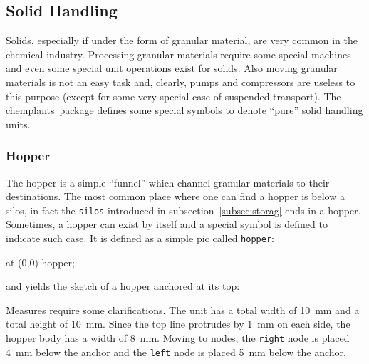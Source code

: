 \documentclass[12pt]{article}						%
\newcommand*{\chpn}[1]{\texttt{#1}}				%
\newcommand*{\chpp}[1]{\texttt{#1}}				%
\newcommand*{\chemplants}{chemplants}
\begin{document}
\subsection{Solid Handling}

Solids, especially if under the form of granular material, are very common in the
chemical industry. Processing granular materials require some special
machines and even some special unit operations exist for solids. Also moving
granular materials is not an easy task and, clearly, pumps and compressors are
useless to this purpose (except for some very special case of suspended
transport). The \chemplants\ package defines some special symbols to denote
``pure'' solid handling units.

\subsubsection{Hopper}

The hopper is a simple ``funnel'' which channel granular materials to their
destinations. The most common place where one can find a hopper is below a silos,
in fact the \chpp{silos} introduced in subsection~\ref{subsec:storag} ends in a
hopper. Sometimes, a hopper can exist by itself and a special symbol is defined
to indicate such case. It is defined as a simple pic called \chpp{hopper}:
\begin{chpcode}
	\pic at (0,0) {hopper};
\end{chpcode}
and yields the sketch of a hopper anchored at its top:
\begin{center}
\end{center}

Measures require some clarifications. The unit has a total width of \SI{10}{\mm}
and a total height of \SI{10}{\mm}. Since the top line protrudes by \SI{1}{\mm}
on each side, the hopper body has a width of \SI{8}{\mm}. Moving to
nodes, the \chpn{right} node is placed \SI{4}{\mm} below the anchor and the
\chpn{left} node is placed \SI{5}{\mm} below the anchor.
\end{document}
